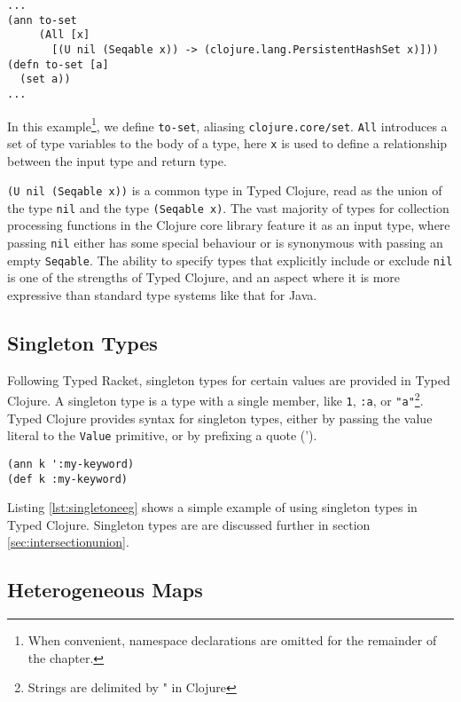 \begin{lstlisting}[caption=Polymorphism in Typed Clojure]
...
(ann to-set 
     (All [x]
       [(U nil (Seqable x)) -> (clojure.lang.PersistentHashSet x)]))
(defn to-set [a]
  (set a))
...
\end{lstlisting}

In this example\footnote{When convenient, namespace declarations are omitted for the remainder of the chapter.}, 
we define \lstinline|to-set|, aliasing \lstinline|clojure.core/set|.
\lstinline|All| introduces a set of type variables to the body of a type,
here \lstinline|x| is used to define a relationship between the input type and return type.

\lstinline|(U nil (Seqable x))| is a common type in Typed Clojure, read as the union
of the type \lstinline|nil| and the type \lstinline|(Seqable x)|.
The vast majority of types for collection processing functions in the Clojure core library feature
it as an input type, where passing \lstinline|nil| either has some special behaviour 
or is synonymous with passing an empty \lstinline|Seqable|.
The ability to specify types that explicitly include or exclude \lstinline|nil| is one of the strengths
of Typed Clojure, and an aspect where it is more expressive than standard type systems like that for Java.

\subsection{Singleton Types}

Following Typed Racket, singleton types for certain values are provided
in Typed Clojure.
A singleton type is a type with a single member, like \lstinline|1|,
\lstinline|:a|, or \lstinline|"a"|\footnote{Strings are delimited by " in Clojure}.
Typed Clojure provides syntax for singleton types, either by passing
the value literal to the \lstinline|Value| primitive, or by prefixing
a quote (').

\begin{lstlisting}[caption=Singleton Types, label=lst:singletoneeg]
(ann k ':my-keyword)
(def k :my-keyword)
\end{lstlisting}

Listing \ref{lst:singletoneeg} shows a simple example of using
singleton types in Typed Clojure.
Singleton types are are discussed further in section \ref{sec:intersectionunion}.

\subsection{Heterogeneous Maps}

